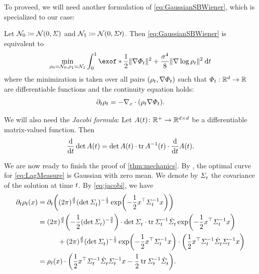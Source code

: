To proveed, we will need another formulation of \eqref{eq:GaussianSBWiener}, which is \citep{chen2016relation, gentil2017analogy} specialized to our case: 
\begin{lemma}\label{lem:EntOT}
Let $\mathcal{N}_0 \coloneqq \mathcal{N}(0,\Sigma)$ and $\mathcal{N}_1 \coloneqq \mathcal{N}(0,\Sigma\prime)$. Then \eqref{eq:GaussianSBWiener} is equivalent to
\begin{align}
\label{eq:LagMeasure}
\min_{\ssstyle\substack{{\measure[0] = \Ninit, \measure[\horizon] = \Nend}}} \int_{0}^\horizon  \exof*{\frac{1}{2} \norm{\vecsol}^2 + \frac{\sdev^4}{8} \norm{ \nabla \log \measure }^2} \dt
\end{align}where the minimization is taken over all pairs $(\rho_{t}, \nabla\Phi_{t})$ such that $\Phi_t:\mathbb{R}^d\to\mathbb{R}$ are differentiable functions and the continuity equation holds:
\begin{equation}
\label{eq:ConeqApp}
\partial_{t}\rho_{t} = - \nabla_{ {x} } \cdot(\rho_{t} \nabla\Phi_{t}).
\end{equation}
\end{lemma}

We will also need the \emph{Jacobi formula}: Let $A(t) \colon \mathbb{R}^+ \to \mathbb{R}^{d\times d} $ be a differentiable matrix-valued function. Then
\begin{align}
\label{eq:jacobi}
\frac{\mathrm{d}}{\mathrm{d}t} \det A(t) = \det A(t) \cdot \operatorname{tr} A^{-1}(t) \cdot \frac{\mathrm{d}}{\mathrm{d}t} A(t).
\end{align}

We are now ready to finish the proof of \cref{thm:mechanics}. By \citet{leonard2013survey}, the optimal curve for \eqref{eq:LagMeasure} is Gaussian with zero mean. We denote by $\Sigma^{}_{ t }$ the covariance of the solution at time $t$. By \eqref{eq:jacobi}, we have
\begin{align}
\nn
\pt\measure(\point) &= \pt \parens*{ \nconst (\det\Sigmasol)^{-\frac{1}{2}} \exp\parens*{ -\frac{1}{2}\point^\top \Sigmasolinv\point   }}  \\
\nn
&=   \nconst \parens*{-\frac{1}{2} (\det\Sigmasol)^{-\frac{3}{2}}}  
\cdot\det\Sigmasol\cdot \tr \Sigmasolinv \dSigmasol \exp\parens*{ -\frac{1}{2}\point^\top \Sigmasolinv\point   } \\
\nn
&\hspace{10mm}+ \nconst (\det\Sigmasol)^{-\frac{1}{2}} \exp\parens*{ -\frac{1}{2}\point^\top \Sigmasolinv\point   } \cdot \parens*{\frac{1}{2} \point^\top \Sigmasolinv \dSigmasol \Sigmasolinv \point} \\
\label{eq:pt-m}
&= \measure(\point) \cdot \parens*{ \frac{1}{2} \point^\top \Sigmasolinv \dSigmasol \Sigmasolinv \point -\frac{1}{2}\tr \Sigmasolinv \dSigmasol }.
\end{align}


